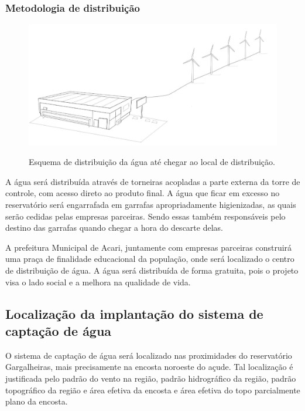\subsubsection{Metodologia de distribuição}
\FloatBarrier
\begin{figure}[!h]
      \centering
      \includegraphics[scale = 0.4]{editaveis/figuras/distribuicao_agua}
      \label{distribuicao_agua}
      \caption[Distribuição água]{Esquema de distribuição da água até chegar ao local de distribuição.}
    \end{figure}
    \FloatBarrier
    A água será distribuída através de torneiras acopladas a parte externa da torre de controle, com acesso direto ao produto final. A água que ficar em excesso no reservatório será engarrafada em garrafas apropriadamente higienizadas, as quais serão cedidas pelas empresas parceiras. Sendo essas também responsáveis pelo destino das garrafas quando chegar a hora do descarte delas.
	
	A prefeitura Municipal de Acari, juntamente com empresas parceiras construirá uma praça de finalidade educacional da população, onde será localizado o centro de distribuição de água. A água será distribuída de forma gratuita, pois o projeto visa o lado social e a melhora na qualidade de vida.

  \subsection{Localização da implantação do sistema de captação de água}
  
    O sistema de captação de água será localizado nas proximidades do reservatório Gargalheiras, mais precisamente na encosta
    noroeste do açude. Tal localização é justificada pelo padrão do vento na região, padrão hidrográfico da região, padrão
    topográfico da região e área efetiva da encosta e área efetiva do topo parcialmente plano da encosta.
    
